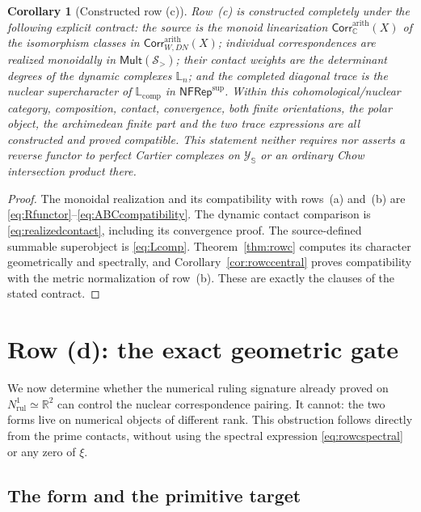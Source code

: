 \documentclass[11pt]{amsart}
\newtheorem{corollary}[theorem]{Corollary}
\theoremstyle{definition}
\theoremstyle{remark}
\newcommand{\C}{\mathbb C}
\begin{document}
\begin{corollary}[Constructed row (c)]\label{cor:rowccomplete}
Row~(c) is constructed completely under the following explicit contract:
the source is the monoid linearization
$\mathsf{Corr}_{\C}^{\mathrm{arith}}(X)$ of the isomorphism classes in
$\mathsf{Corr}_{W,DN}^{\mathrm{arith}}(X)$; individual correspondences are
realized monoidally in $\mathsf{Mult}(\mathcal S_>)$; their contact weights
are the determinant degrees of the dynamic complexes $\mathbb L_n$; and
the completed diagonal trace is the nuclear supercharacter of
$\mathbb L_{\mathrm{comp}}$ in $\mathsf{NFRep}^{\mathrm{sup}}$.  Within
this cohomological/nuclear category, composition, contact, convergence,
both finite orientations, the polar object, the archimedean finite part and
the two trace expressions are all constructed and proved compatible.
This statement neither requires nor asserts a reverse functor to perfect
Cartier complexes on $\mathscr Y_{\mathbb S}$ or an ordinary Chow
intersection product there.
\end{corollary}

\begin{proof}
The monoidal realization and its compatibility with rows~(a) and~(b) are
\eqref{eq:Rfunctor}--\eqref{eq:ABCcompatibility}.  The dynamic contact
comparison is \eqref{eq:realizedcontact}, including its convergence proof.
The source-defined summable superobject is \eqref{eq:Lcomp}.
Theorem~\ref{thm:rowc} computes its character geometrically and spectrally,
and Corollary~\ref{cor:rowccentral} proves compatibility with the metric
normalization of row~(b).  These are exactly the clauses of the stated
contract.
\end{proof}



\section{Row (d): the exact geometric gate}
\label{sec:rowdgate}

We now determine whether the numerical ruling signature already proved on
$N^1_{\mathrm{rul}}\simeq\mathbb R^2$ can control the nuclear correspondence
pairing.  It cannot: the two forms live on numerical objects of different
rank.  This obstruction follows directly from the prime contacts, without
using the spectral expression \eqref{eq:rowcspectral} or any zero of $\xi$.

\subsection{The form and the primitive target}
\end{document}
